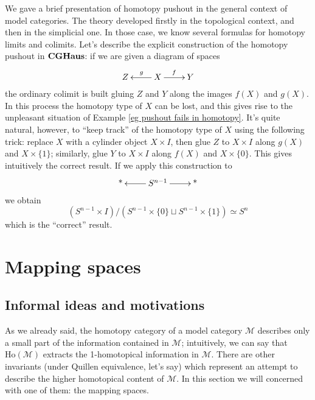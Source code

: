 \begin{refsection}
\begin{rmk}
We gave a brief presentation of homotopy pushout in the general context of model categories. The theory developed firstly in the topological context, and then in the simplicial one. In those case, we know several formulas for homotopy limits and colimits. Let's describe the explicit construction of the homotopy pushout in $\mathbf{CGHaus}$: if we are given a diagram of spaces
\[
\xymatrix{
Z & X \ar[l]_g \ar[r]^f & Y
}
\]
the ordinary colimit is built gluing $Z$ and $Y$ along the images $f(X)$ and $g(X)$. In this process the homotopy type of $X$ can be lost, and this gives rise to the unpleasant situation of Example \ref{eg pushout fails in homotopy}. It's quite natural, however, to ``keep track'' of the homotopy type of $X$ using the following trick: replace $X$ with a cylinder object $X \times I$, then glue $Z$ to $X \times I$ along $g(X)$ and $X \times \{1\}$; similarly, glue $Y$ to $X \times I$ along $f(X)$ and $X \times \{0\}$. This gives intuitively the correct result. If we apply this construction to
\[
\xymatrix{
\text{*} & S^{n-1} \ar[r] \ar[l] & \text{*}
}
\]
we obtain
\[
(S^{n-1} \times I) / (S^{n-1} \times \{0\} \sqcup S^{n-1} \times \{1\}) \simeq S^n
\]
which is the ``correct'' result.
\end{rmk}

\section{Mapping spaces}

\subsection{Informal ideas and motivations}

As we already said, the homotopy category of a model category $\mathcal M$ describes only a small part of the information contained in $\mathcal M$; intuitively, we can say that $\mathrm{Ho}(\mathcal M)$ extracts the 1-homotopical information in $\mathcal M$. There are other invariants (under Quillen equivalence, let's say) which represent an attempt to describe the higher homotopical content of $\mathcal M$. In this section we will concerned with one of them: the mapping spaces.


\end{refsection}
